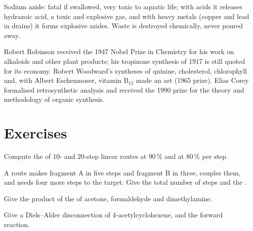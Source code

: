 \begin{safety}{}
Sodium azide: fatal if swallowed, very toxic to aquatic life; with acids it
releases hydrazoic acid, a toxic and explosive gas, and with heavy metals
(copper and lead in drains) it forms explosive azides. Waste is destroyed
chemically, never poured away.
\end{safety}

\begin{history}
Robert Robinson received the 1947 Nobel Prize in Chemistry for his work on
alkaloids and other plant products; his tropinone synthesis of 1917 is still
quoted for its economy. Robert Woodward's syntheses of quinine, cholesterol,
chlorophyll and, with Albert Eschenmoser, vitamin $\mathrm B_{12}$ made  an art
(1965 prize). Elias Corey formalised retrosynthetic analysis and received the
1990 prize for the theory and methodology of organic synthesis.
\end{history}

\section{Exercises}

\begin{exercise}[$\star$]\label{exo:b3:total-synthesis:1}
Compute the  of 10- and 20-step linear routes at 90\,\% and at 80\,\% per
step.
\end{exercise}

\begin{exercise}[$\star$]\label{exo:b3:total-synthesis:2}
A route makes fragment A in five steps and fragment B in three, couples them, and
needs four more steps to the target. Give the total number of steps and the
.
\end{exercise}

\begin{exercise}[$\star$]\label{exo:b3:total-synthesis:3}
Give the product of the  of acetone, formaldehyde and
dimethylamine.
\end{exercise}

\begin{exercise}[$\star$]\label{exo:b3:total-synthesis:4}
Give a Diels--Alder disconnection of 4-acetylcyclohexene, and the forward
reaction.
\end{exercise}

